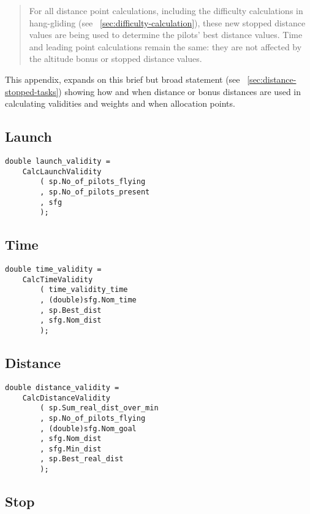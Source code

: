 \documentclass[gap.tex]{subfiles}
\begin{document}
\label{sec:bonus-distance-use}

\begin{quote}
    For all distance point calculations, including the difficulty calculations
    in hang-gliding (see ~\ref{sec:difficulty-calculation}), these new stopped
    distance values are being used to determine the pilots’ best distance
    values.  Time and leading point calculations remain the same: they are not
    affected by the altitude bonus or stopped distance values. 
\end{quote}

This appendix, expands on this brief but broad statement (see
~\ref{sec:distance-stopped-tasks}) showing how and when distance or bonus
distances are used in calculating validities and weights and when allocation
points.

\subsection{Launch}

\begin{lstlisting}
double launch_validity =
    CalcLaunchValidity
        ( sp.No_of_pilots_flying
        , sp.No_of_pilots_present
        , sfg
        );
\end{lstlisting}

\subsection{Time}

\begin{lstlisting}
double time_validity =
    CalcTimeValidity
        ( time_validity_time
        , (double)sfg.Nom_time
        , sp.Best_dist
        , sfg.Nom_dist
        );
\end{lstlisting}

\subsection{Distance}

\begin{lstlisting}
double distance_validity =
    CalcDistanceValidity
        ( sp.Sum_real_dist_over_min
        , sp.No_of_pilots_flying
        , (double)sfg.Nom_goal
        , sfg.Nom_dist
        , sfg.Min_dist
        , sp.Best_real_dist
        );
\end{lstlisting}

\subsection{Stop}
\end{document}
